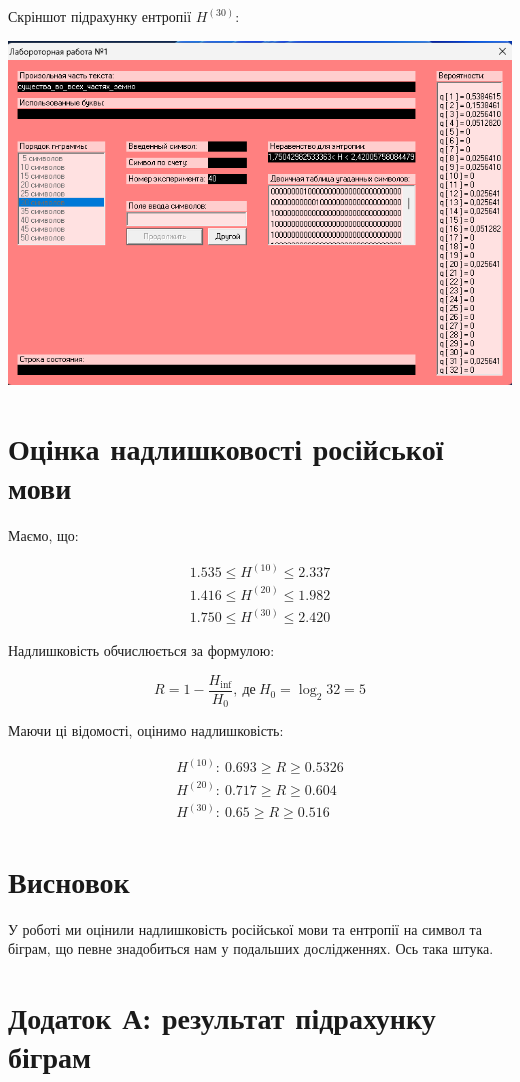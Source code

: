 \documentclass[12pt]{article}
\begin{document}
    Скріншот підрахунку ентропії $H^{(30)}$:

    \begin{center}
        \includegraphics[scale=0.6]{Ентропія 30-грами.png}
    \end{center}

    \section{Оцінка надлишковості російської мови}

    Маємо, що:

    \begin{align*}
        1.535 \le H^{(10)} \le 2.337 \\
        1.416 \le H^{(20)} \le 1.982 \\
        1.750 \le H^{(30)} \le 2.420
    \end{align*}

    Надлишковість обчислюється за формулою:

    $$
        R = 1 - \frac{H_{\inf}}{H_0},\ \text{де}\ H_0 = \log_2 32 = 5
    $$

    Маючи ці відомості, оцінимо надлишковість:

    \begin{align*}
        H^{(10)}:\ 0.693 \geq R \geq 0.5326 \\
        H^{(20)}:\ 0.717 \geq R \geq 0.604 \\
        H^{(30)}:\ 0.65 \geq R \geq 0.516
    \end{align*}

    \section{Висновок}

    У роботі ми оцінили надлишковість російської мови та ентропії на символ та біграм,
    що певне знадобиться нам у подальших дослідженнях. Ось така штука.

    \section*{Додаток А: результат підрахунку біграм}

    
\end{document}
